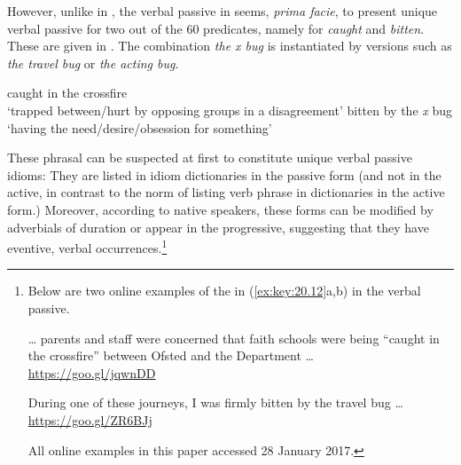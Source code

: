 \documentclass[output=paper]{langsci/langscibook}
\begin{document}
\ea\label{ex:key:20.9}
    \z
\z
\newpage

\ea\label{ex:key:20.10}
    \z
\z

\ea\label{ex:key:20.11}
    \z
\z

However, unlike in , the verbal passive in  seems,
\emph{prima facie}, to present unique verbal passive 
for two out of the 60
predicates, namely for \emph{caught} and \emph{bitten}. These  are given
in . The combination \emph{the x bug} is instantiated by
versions such as \emph{the travel bug} or \emph{the acting bug}.

\ea\label{ex:key:20.12}
    \ea\label{ex:key:20.12a} caught in the crossfire\\
        ‘trapped between/hurt by opposing groups in a disagreement’
    \ex\label{ex:key:20.12b} bitten by the \emph{x} bug\\
        ‘having the need/desire/obsession for something’
    \z
\z

These phrasal  can be suspected at first to constitute unique verbal
passive idioms: They are listed in idiom dictionaries in the passive form (and
not in the active, in contrast to the norm of listing verb phrase  in
dictionaries in the active form.) Moreover, according to native speakers, these
forms can be modified by adverbials of duration or appear in the progressive,
suggesting that they have eventive, verbal occurrences.\footnote{Below
are two online examples of the  in (\ref{ex:key:20.12}a,b) in the
verbal passive.

\begin{exe}

     \dots{} parents and staff were concerned that faith schools were
    being “caught in the crossfire” between Ofsted and the Department
    \dots{}\\\hspace*{\fill}\url{https://goo.gl/jqwnDD}

     During one of these journeys, I was firmly bitten by the travel
    bug \dots{}\\\hspace*{\fill}\url{https://goo.gl/ZR6BJj}

\end{exe}

All online examples in this paper accessed 28 January 2017.}
\end{document}
